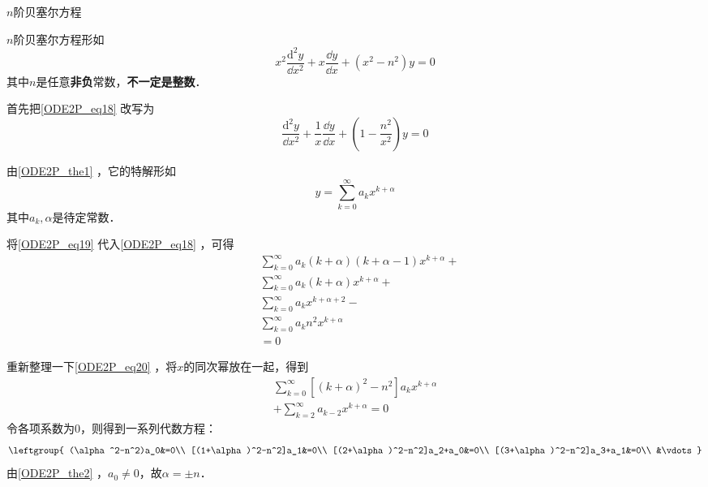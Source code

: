 




\begin{example}{$n$阶贝塞尔方程}

$n$阶贝塞尔方程形如
\begin{equation}\label{ODE2P_eq18}
x^2\frac{\mathrm{d}^2 y}{\dd x^2}+x\frac{\dd y}{\dd x}+(x^2-n^2)y=0
\end{equation}
其中$n$是任意\textbf{非负}常数，\textbf{不一定是整数}．

首先把\autoref{ODE2P_eq18} 改写为
\begin{equation}
\frac{\mathrm{d}^2 y}{\dd x^2}+\frac{1}{x}\frac{\dd y}{\dd x}+(1-\frac{n^2}{x^2})y=0
\end{equation}

由\autoref{ODE2P_the1} ，它的特解形如
\begin{equation}\label{ODE2P_eq19}
y=\sum\limits_{k=0}^\infty a_kx^{k+\alpha}
\end{equation}
其中$a_k, \alpha$是待定常数．

将\autoref{ODE2P_eq19} 代入\autoref{ODE2P_eq18} ，可得
\begin{equation}\label{ODE2P_eq20}
\begin{aligned}
&\sum\limits^\infty_{k=0}a_k(k+\alpha)(k+\alpha-1)x^{k+\alpha}+\\
&\sum\limits^\infty_{k=0}a_k(k+\alpha)x^{k+\alpha}+\\
&\sum\limits^\infty_{k=0}a_kx^{k+\alpha+2}-\\
&\sum\limits^\infty_{k=0}a_kn^2x^{k+\alpha}\\
&=0
\end{aligned}
\end{equation}

重新整理一下\autoref{ODE2P_eq20} ，将$x$的同次幂放在一起，得到
\begin{equation}
\begin{aligned}
\sum\limits^\infty_{k=0}[(k+\alpha)^2-n^2]a_kx^{k+\alpha}\\
+\sum\limits^\infty_{k=2}a_{k-2}x^{k+\alpha}=0
\end{aligned}
\end{equation}
令各项系数为$0$，则得到一系列代数方程：
\begin{equation}\label{ODE2P_eq21}
\leftgroup{
    (\alpha^2-n^2)a_0&=0\\
    [(1+\alpha)^2-n^2]a_1&=0\\
    [(2+\alpha)^2-n^2]a_2+a_0&=0\\
    [(3+\alpha)^2-n^2]a_3+a_1&=0\\
    &\vdots
}
\end{equation}
由\autoref{ODE2P_the2} ，$a_0\neq 0$，故$\alpha=\pm n$．


\end{example}
